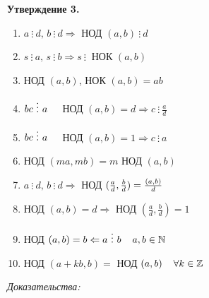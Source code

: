 \documentclass[12pt]{article}
\let\gcd\relax
\DeclareMathOperator{\gcd}{НОД}
\begin{document}
\textbf{Утверждение 3.}\par
\begin{enumerate}
    \item $a \ \vdots\  d , \, b \ \vdots\  d \Rightarrow$ НОД $(a,b) \ \vdots\  d$
    \item $s \ \vdots\  a , \, s \ \vdots\  b \Rightarrow s \ \vdots\ $ НОК $(a,b)$
    \item НОД $(a,b)$, НОК $(a,b) = ab$
    \item $bc \ \vdots\  a \hspace{4 mm}$ НОД $(a,b)=d \Rightarrow c \ \vdots\  \frac{a}{d}$
    \item $bc \ \vdots\  a \hspace{4 mm}$ НОД $(a,b)=1 \Rightarrow c \ \vdots\  a$
    \item НОД $(ma, mb) = m$ НОД $(a,b)$
    \item $a \ \vdots\  d, \, b \ \vdots\  d \Rightarrow$ НОД $(\frac{a}{d}, \frac{b}{d}) = \frac{\gcd(a,b)}{d}$
    \item НОД $(a,b) = d \Rightarrow$ НОД $(\frac{a}{d}, \frac{b}{d})=1$
    \item НОД $(a,b)=b \Leftarrow a \ \vdots\  b \hspace{4 mm} a,b \in \mathbb{N}$
    \item НОД $(a+kb,b) =$ НОД $(a,b) \hspace{4 mm} \forall k \in \mathbb{Z}$
\end{enumerate}\par
\textit{Доказательства:}\par
\end{document}
